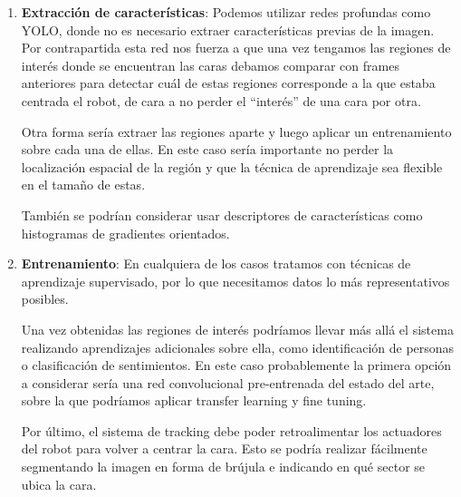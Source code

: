 \begin{enumerate}
    \item \textbf{Extracción de características}:
    Podemos utilizar redes profundas como YOLO, donde no es necesario extraer características previas de la imagen. Por contrapartida esta red nos fuerza a que una vez tengamos las regiones de interés donde se encuentran las caras debamos comparar con frames anteriores para detectar cuál de estas regiones corresponde a la que estaba centrada el robot, de cara a no perder el ``interés'' de una cara por otra.

    Otra forma sería extraer las regiones aparte y luego aplicar un entrenamiento sobre cada una de ellas. En este caso sería importante no perder la localización espacial de la región y que la técnica de aprendizaje sea flexible en el tamaño de estas.

    También se podrían considerar usar descriptores de características como histogramas de gradientes orientados.
    
    \item \textbf{Entrenamiento}:
    En cualquiera de los casos tratamos con técnicas de aprendizaje supervisado, por lo que necesitamos datos lo más representativos posibles.

    Una vez obtenidas las regiones de interés podríamos llevar más allá el sistema realizando aprendizajes adicionales sobre ella, como identificación de personas o clasificación de sentimientos. En este caso probablemente la primera opción a considerar sería una red convolucional pre-entrenada del estado del arte, sobre la que podríamos aplicar transfer learning y fine tuning.

    Por último, el sistema de tracking debe poder retroalimentar los actuadores del robot para volver a centrar la cara. Esto se podría realizar fácilmente segmentando la imagen en forma de brújula e indicando en qué sector se ubica la cara.
\end{enumerate}



